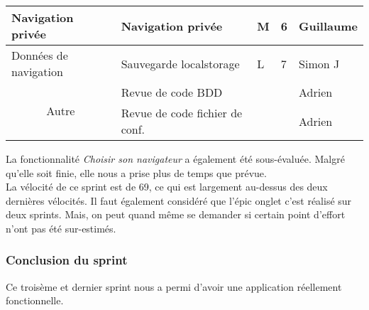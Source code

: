 \documentclass[10pt,a4paper]{article}
\begin{document}
\begin{table}[h]
\begin{tabular}{|c|l|l|l|l|}
\multicolumn{1}{|l|}{Navigation privée}     & Navigation privée                                                                           & M                                            & 6                                           & Guillaume          \\ \hline
\multicolumn{1}{|l|}{Données de navigation} & Sauvegarde localstorage                                                                     & L                                            & 7                                           & Simon J            \\ \hline
\multirow{2}{*}{Autre}                      & Revue de code BDD                                                                           &                                              &                                             & Adrien             \\ \cline{2-5} 
                                            & Revue de code fichier de conf.                                                              &                                              &                                             & Adrien             \\ \hline
\end{tabular}
\end{table}

La fonctionnalité \textit{Choisir son navigateur} a également été sous-évaluée. Malgré qu'elle soit finie, elle nous a prise plus de temps que prévue. \\

La vélocité de ce sprint est de 69, ce qui est largement au-dessus des deux dernières vélocités. Il faut également considéré que l'épic onglet c'est réalisé sur deux sprints. Mais, on peut quand même se demander si certain point d'effort n'ont pas été sur-estimés.

\subsubsection{Conclusion du sprint}
Ce troisème et dernier sprint nous a permi d'avoir une application réellement fonctionnelle.


\newpage
\end{document}
